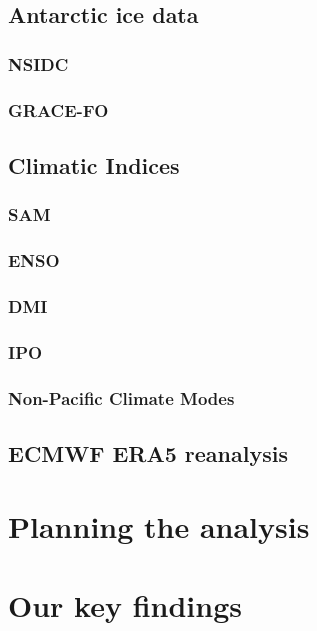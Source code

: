 \documentclass[../main.tex]{subfiles}
\begin{document}
\subsection{Antarctic ice data}
\subsubsection*{NSIDC}
\subsubsection*{GRACE-FO}

\subsection{Climatic Indices}
\subsubsection*{SAM}
\subsubsection*{ENSO}
\subsubsection*{DMI}
\subsubsection*{IPO}
\subsubsection*{Non-Pacific Climate Modes}

\subsection{ECMWF ERA5 reanalysis}

\section{Planning the analysis}

\section{Our key findings}
\end{document}
